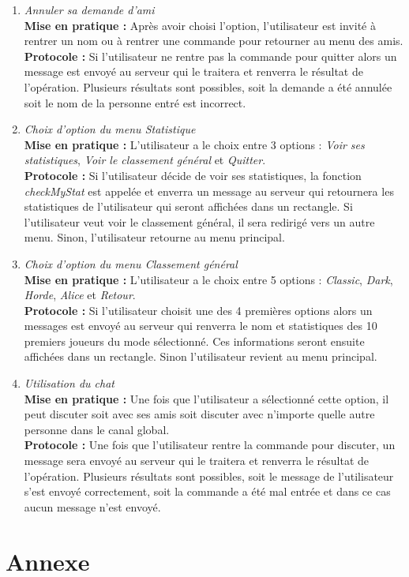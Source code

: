 \documentclass[10pt, a4paper]{article}
\begin{document}
\begin{enumerate}
\item \textit{Annuler sa demande d'ami}\\
\textbf{Mise en pratique :} Après avoir choisi l'option, l'utilisateur est invité à rentrer un nom ou à rentrer une commande pour retourner au menu des amis.\\
\textbf{Protocole :} Si l'utilisateur ne rentre pas la commande pour quitter alors un message est envoyé au serveur qui le traitera et renverra le résultat de l'opération. Plusieurs résultats sont possibles, soit la demande a été annulée soit le nom de la personne entré est incorrect.

\item \textit{Choix d'option du menu Statistique}\\
\textbf{Mise en pratique :} L'utilisateur a le choix entre 3 options : \textit{Voir ses statistiques}, \textit{Voir le classement général} et \textit{Quitter}.\\
\textbf{Protocole :} Si l'utilisateur décide de voir ses statistiques, la fonction \textit{checkMyStat} est appelée et enverra un message au serveur qui retournera les statistiques de l'utilisateur qui seront affichées dans un rectangle. Si l'utilisateur veut voir le classement général, il sera redirigé vers un autre menu. Sinon, l'utilisateur retourne au menu principal.

\item \textit{Choix d'option du menu Classement général}\\
\textbf{Mise en pratique :} L'utilisateur a le choix entre 5 options : \textit{Classic}, \textit{Dark}, \textit{Horde}, \textit{Alice} et \textit{Retour}. \\
\textbf{Protocole :} Si l'utilisateur choisit une des 4 premières options alors un messages est envoyé au serveur qui renverra le nom et statistiques des 10 premiers joueurs du mode sélectionné. Ces informations seront ensuite affichées dans un rectangle. Sinon l'utilisateur revient au menu principal.


\item \textit{Utilisation du chat}\\
\textbf{Mise en pratique :} Une fois que l'utilisateur a sélectionné cette option, il peut discuter soit avec ses amis soit discuter avec n'importe quelle autre personne dans le canal global.\\
\textbf{Protocole :} Une fois que l'utilisateur rentre la commande pour discuter, un message sera envoyé au serveur qui le traitera et renverra le résultat de l'opération. Plusieurs résultats sont possibles, soit le message de l'utilisateur s'est envoyé correctement, soit la commande a été mal entrée et dans ce cas aucun message n'est envoyé.

\end{enumerate}

\section{Annexe}
\end{document}
